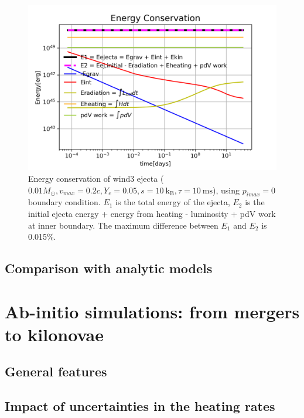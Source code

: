 \documentclass[fleqn,usenatbib]{mnras}
\begin{document}
\begin{figure}
\centering
\includegraphics[scale=0.6]{figures/energy_conservation_wind3_Apr2.png}
\caption{Energy conservation of wind3 ejecta ($0.01M_{\odot}, v_{max}=0.2c, Y_e=0.05, s=10\ \mathrm{k_B}, \tau=10\ \mathrm{ ms}$), using $p_{imax}=0$ boundary condition. $E_1$ is the total energy of the ejecta, $E_2$ is the initial ejecta energy + energy from heating - luminosity + pdV work at inner boundary. The maximum difference between $E_1$ and $E_2$ is 0.015\%.}
\label{energy_conservation}
\end{figure}



\subsection{Comparison with analytic models}

\section{Ab-initio simulations: from mergers to kilonovae}
\subsection{General features}
\subsection{Impact of uncertainties in the heating rates}

\end{document}
